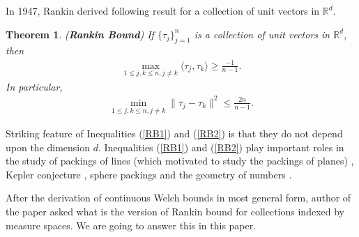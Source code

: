 \documentclass{amsart}
\newtheorem{theorem}{Theorem}[section]
\begin{document}
In 1947, Rankin derived following result for a collection of unit vectors in $\mathbb{R}^d$. 
\begin{theorem} (\textbf{Rankin Bound}) \label{RB} \cite{TROPP, RANKIN, RANKIN2}
If $\{\tau_j\}_{j=1}^n$ is a collection of unit vectors in $\mathbb{R}^d$, then 
\begin{align}\label{RB1}
	\max _{1\leq j,k \leq n, j\neq k}\langle \tau_j, \tau_k\rangle \geq\frac{-1}{n-1}.
\end{align}
In particular, 
\begin{align}\label{RB2}
	\min _{1\leq j,k \leq n, j\neq k}\|\tau_j-\tau_k\|^2\leq 	\frac{2n}{n-1}.
\end{align}
\end{theorem}
Striking feature of Inequalities (\ref{RB1}) and  (\ref{RB2}) is that they do not depend upon the dimension $d$.  Inequalities (\ref{RB1}) and  (\ref{RB2})  play important roles in the study of  packings of lines (which  motivated to  study  the packings of planes) \cite{DHILLONHEATHSTROHMER, CONWAYHARDINSLOANE}, Kepler conjecture \cite{HALES, SZPIRO},  sphere packings \cite{BERNDTKOHNENONO, ZONG} and the geometry of numbers \cite{CASSELS}. 

After the derivation of continuous Welch bounds in most general form, author of the paper  \cite{KRISHNA} asked what is the version of Rankin bound for collections indexed by measure spaces. We are going to answer this in this paper.
\end{document}
